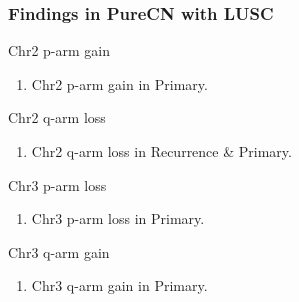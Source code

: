 \documentclass{beamer}
\begin{document}
    \begin{frame}[allowframebreaks]
        \frametitle{Findings in PureCN with LUSC}

        \begin{block}{Chr2 p-arm gain}
            \begin{enumerate}
                \item Chr2 p-arm gain in Primary.
            \end{enumerate}

            \begin{table}
                \caption{CGC Tier1 genes in Chr2 p-arm}
                \resizebox{\linewidth}{!}
                {}
            \end{table}
        \end{block}

        \begin{block}{Chr2 q-arm loss}
            \begin{enumerate}
                \item Chr2 q-arm loss in Recurrence \& Primary.
            \end{enumerate}

            \begin{table}
                \caption{CGC Tier1 genes in Chr2 q-arm}
                \resizebox{\linewidth}{!}
                {}
            \end{table}
        \end{block}

        \begin{block}{Chr3 p-arm loss}
            \begin{enumerate}
                \item Chr3 p-arm loss in Primary.
            \end{enumerate}

            \begin{table}
                \caption{CGC Tier1 genes in Chr3 p-arm}
                \resizebox{\linewidth}{!}
                {}
            \end{table}
        \end{block}

        \begin{block}{Chr3 q-arm gain}
            \begin{enumerate}
                \item Chr3 q-arm gain in Primary.
            \end{enumerate}


\end{block}
\end{frame}
\end{document}
